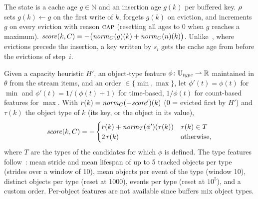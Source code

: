 \begin{definition}\label{def:lfuda}
The state is a cache age $g \in \mathbb{N}$ and an insertion age $g(k)$ per
buffered key. $\rho$ sets $g(k) \leftarrow g$ on the first write of $k$, forgets
$g(k)$ on eviction, and increments $g$ on every eviction with reason $\textsc{cap}$
(resetting all ages to $0$ when $g$ reaches a maximum).
$\mathit{score}(k, C) = -\bigl(\mathit{norm}_C(g)(k) + \mathit{norm}_C(n)(k)\bigr)$.
Unlike~\cite{Liss2025}, where evictions precede the insertion, a key written by
$s_i$ gets the cache age from before the evictions of step~$i$.
\end{definition}

\begin{definition}\label{def:priority}
Given a capacity heuristic $H'$, an object-type feature $\phi \colon \mathbb{U}_{\mathit{type}}
\rightharpoonup \mathbb{R}$ maintained in $\theta$ from the stream items, and an
order $\in \{\min, \max\}$, let $\phi'(t) = \phi(t)$ for $\min$ and
$\phi'(t) = 1/(\phi(t)+1)$ for time-based, $1/\phi(t)$ for count-based features
for $\max$. With $r(k) = \mathit{norm}_C(-\mathit{score}')(k)$ (0 = evicted first by $H'$)
and $\tau(k)$ the object type of $k$ (its key, or the object in its value),
\[
  \mathit{score}(k, C) = -\begin{cases}
    r(k) + \mathit{norm}_{T}(\phi')(\tau(k)) & \tau(k) \in T\\
    2\,r(k) & \text{otherwise,}
  \end{cases}
\]
where $T$ are the types of the candidates for which $\phi$ is defined. The
type features follow~\cite{Liss2025}: mean stride and mean lifespan of up to 5
tracked objects per type (strides over a window of 10), mean objects per event
of the type (window 10), distinct objects per type (reset at 1000), events per
type (reset at $10^5$), and a custom order. Per-object features are not
available since buffers mix object types.
\end{definition}
